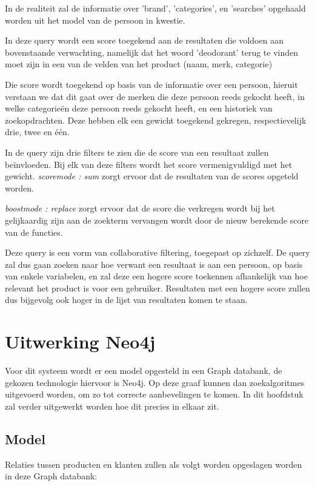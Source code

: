 In de realiteit zal de informatie over 'brand', 'categories', en 'searches' opgehaald worden uit het model van de persoon in kwestie.

In deze query wordt een score toegekend aan de resultaten die voldoen aan bovenstaande verwachting, namelijk dat het woord 'deodorant' terug te vinden moet zijn in een van de velden van het product (naam, merk, categorie)

Die score wordt toegekend op basis van de informatie over een persoon, hieruit verstaan we dat dit gaat over de merken die deze persoon reeds gekocht heeft, in welke categorieën deze persoon reeds gekocht heeft, en een historiek van zoekopdrachten. Deze hebben elk een gewicht toegekend gekregen, respectievelijk drie, twee en één. 

In de query zijn drie filters te zien die de score van een resultaat zullen beïnvloeden. Bij elk van deze filters wordt het score vermenigvuldigd met het gewicht. \textit{score\textunderscore mode : sum} zorgt ervoor dat de resultaten van de scores opgeteld worden.

\textit{boost\textunderscore mode : replace} zorgt ervoor dat de score die verkregen wordt bij het gelijkaardig zijn aan de zoekterm vervangen wordt door de nieuw berekende score van de functies.

Deze query is een vorm van collaborative filtering, toegepast op zichzelf. De query zal dus gaan zoeken naar hoe verwant een resultaat is aan een persoon, op basis van enkele variabelen, en zal deze een hogere score toekennen afhankelijk van hoe relevant het product is voor een gebruiker. Resultaten met een hogere score zullen dus bijgevolg ook hoger in de lijst van resultaten komen te staan.




\section{Uitwerking Neo4j}
\label{sec:UItwerking Neo4j}

Voor dit systeem wordt er een model opgesteld in een Graph databank, de gekozen technologie hiervoor is Neo4j. Op deze graaf kunnen dan zoekalgoritmes uitgevoerd worden, om zo tot correcte aanbevelingen te komen. In dit hoofdstuk zal verder uitgewerkt worden hoe dit precies in elkaar zit.

\subsection{Model}
\label{sec:Model}
Relaties tussen producten en klanten zullen als volgt worden opgeslagen worden in deze Graph databank:

